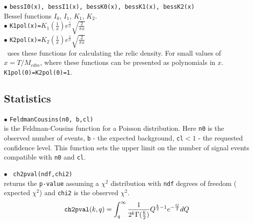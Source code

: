 \documentclass[12pt,a4paper]{article}
\begin{document}
\noindent$\bullet$ \verb|bessI0(x), bessI1(x), bessK0(x), bessK1(x), bessK2(x) |\\
 Bessel functions $I_0$, $I_1$, $K_1$, $K_2$.\\ 

\noindent$\bullet$ \verb|K1pol(x)=|$K_1(\frac{1}{x}) e^\frac{1}{x}
\sqrt{\frac{2}{\pi x}}$  \\
\noindent$\bullet$ \verb|K2pol(x)=|$K_2(\frac{1}{x}) e^\frac{1}{x}
\sqrt{\frac{2}{\pi x}}$   \\
\micro\ uses these functions for calculating the  relic density. For 
small values of $x=T/M_{cdm}$, where these functions can be presented as polynomials in $x$.
\verb|K1pol(0)=K2pol(0)=1|. 

\subsection{Statistics}
\noindent$\bullet$ \verb|FeldmanCousins(n0, b,cl)|\\
is the Feldman-Cousins \cite{Feldman:1997qc}  function for a Poisson distribution.
Here {\tt n0} is the observed number of events, {\tt b} -  the expected background,
\verb|cl|$ < 1 $ - the requested confidence level. This function sets the upper limit on the number 
of signal events compatible with {\tt n0}  and {\tt cl}.

\noindent$\bullet$ \verb| ch2pval(ndf,chi2)|\\ 
returns the {\tt p-value} assuming a $\chi^2$ distribution with  {\tt ndf} degrees
of freedom ( expected  $\chi^2$) and {\tt chi2} is the observed $\chi^2$.  
$$   
{  \verb|ch2pval|(k,q)=\int_q^\infty  \frac{1}{2^k \Gamma(\frac{k}{2})} Q^{\frac{k}{2}-1}
e^{-\frac{Q}{2}} dQ } $$   


\end{document}
